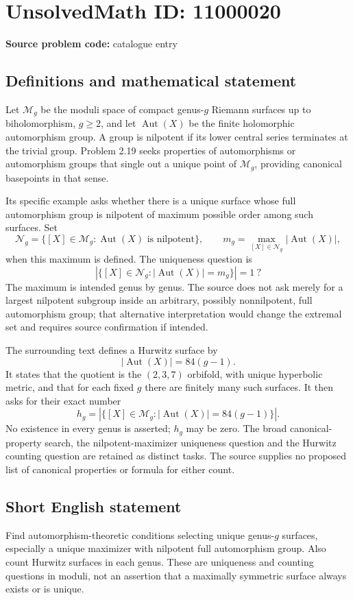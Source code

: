\documentclass[11pt]{article}
\begin{document}
\section*{UnsolvedMath ID: 11000020}
\textbf{Source problem code:} catalogue entry
\subsection{Definitions and mathematical statement}
Let \(\mathcal M_g\) be the moduli space of compact genus-\(g\) Riemann surfaces up to biholomorphism, \(g\ge2\), and let \(\operatorname{Aut}(X)\) be the finite holomorphic automorphism group. A group is nilpotent if its lower central series terminates at the trivial group. Problem 2.19 seeks properties of automorphisms or automorphism groups that single out a unique point of \(\mathcal M_g\), providing canonical basepoints in that sense.

Its specific example asks whether there is a unique surface whose full automorphism group is nilpotent of maximum possible order among such surfaces. Set
\[
 \mathcal N_g=\{[X]\in\mathcal M_g:\operatorname{Aut}(X)\text{ is nilpotent}\},
 \qquad m_g=\max_{[X]\in\mathcal N_g}|\operatorname{Aut}(X)|,
\]
when this maximum is defined. The uniqueness question is
\[
 \left|\{[X]\in\mathcal N_g:|\operatorname{Aut}(X)|=m_g\}\right|=1\ ?
\]
The maximum is intended genus by genus. The source does not ask merely for a largest nilpotent subgroup inside an arbitrary, possibly nonnilpotent, full automorphism group; that alternative interpretation would change the extremal set and requires source confirmation if intended.

The surrounding text defines a Hurwitz surface by
\[
 |\operatorname{Aut}(X)|=84(g-1).
\]
It states that the quotient is the \((2,3,7)\) orbifold, with unique hyperbolic metric, and that for each fixed \(g\) there are finitely many such surfaces. It then asks for their exact number
\[
 h_g=\left|\{[X]\in\mathcal M_g:|\operatorname{Aut}(X)|=84(g-1)\}\right|.
\]
No existence in every genus is asserted; \(h_g\) may be zero. The broad canonical-property search, the nilpotent-maximizer uniqueness question and the Hurwitz counting question are retained as distinct tasks. The source supplies no proposed list of canonical properties or formula for either count.
\subsection{Short English statement}
Find automorphism-theoretic conditions selecting unique genus-\(g\) surfaces, especially a unique maximizer with nilpotent full automorphism group. Also count Hurwitz surfaces in each genus. These are uniqueness and counting questions in moduli, not an assertion that a maximally symmetric surface always exists or is unique.
\end{document}
